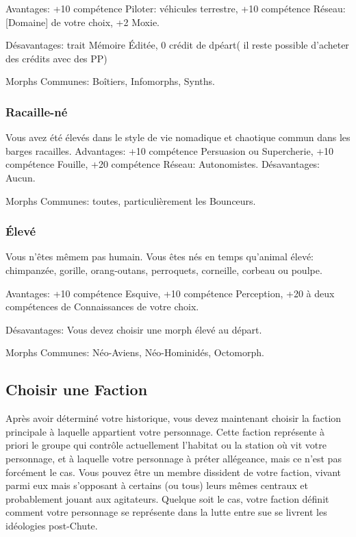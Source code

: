 Avantages: +10 compétence Piloter: véhicules terrestre, +10 compétence Réseau: [Domaine] de votre choix, +2 Moxie. 

Désavantages: trait Mémoire Éditée, 0 crédit de dpéart( il reste possible d'acheter des crédits avec des PP) 

Morphs Communes: Boîtiers, Infomorphs, Synths. 

\subsubsection{Racaille-né} \label{sec:scumborn} 

Vous avez été élevés dans le style de vie nomadique et chaotique commun dans les barges racailles. Advantages: +10 compétence Persuasion ou Supercherie, +10 compétence Fouille, +20 compétence Réseau: Autonomistes.  Désavantages: Aucun. 

Morphs Communes: toutes, particulièrement les Bounceurs. 

\subsubsection{Élevé} \label{sec:uplift} 

Vous n'êtes mêmem pas humain. Vous êtes nés en temps qu'animal élevé: chimpanzée, gorille, orang-outans, perroquets, corneille, corbeau ou poulpe. 

Avantages: +10 compétence Esquive, +10 compétence Perception, +20 à deux compétences de Connaissances de votre choix. 

Désavantages: Vous devez choisir une morph élevé au départ. 

Morphs Communes: Néo-Aviens, Néo-Hominidés, Octomorph. 

\subsection{Choisir une Faction} \label{sec:choose-faction} 

Après avoir déterminé votre historique, vous devez maintenant choisir la faction principale à laquelle appartient votre personnage. Cette faction représente à priori le groupe qui contrôle actuellement l'habitat ou la station où vit votre personnage, et à laquelle votre personnage à préter allégeance, mais ce n'est pas forcément le cas. Vous pouvez être un membre dissident de votre faction, vivant parmi eux mais s'opposant à certains (ou tous) leurs mêmes centraux et probablement jouant aux agitateurs. Quelque soit le cas, votre faction définit comment votre personnage se représente dans la lutte entre sue se livrent les idéologies post-Chute. 

